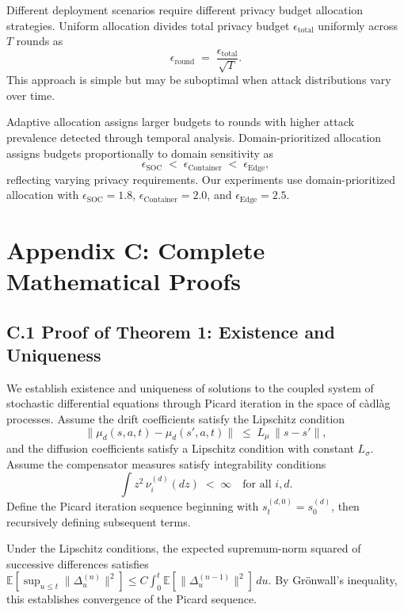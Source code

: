 \documentclass[12pt,a4paper]{article}
\theoremstyle{definition}
\begin{document}
\begingroup
\setlength{\emergencystretch}{2em}

Different deployment scenarios require different privacy budget allocation strategies. Uniform allocation divides total privacy budget \(\epsilon_{\text{total}}\) uniformly across \(T\) rounds as
\[
\epsilon_{\text{round}} \;=\; \frac{\epsilon_{\text{total}}}{\sqrt{T}}.
\]
This approach is simple but may be suboptimal when attack distributions vary over time.

Adaptive allocation assigns larger budgets to rounds with higher attack prevalence detected through temporal analysis. Domain-prioritized allocation assigns budgets proportionally to domain sensitivity as
\[
\epsilon_{\text{SOC}} \;<\; \epsilon_{\text{Container}} \;<\; \epsilon_{\text{Edge}},
\]
reflecting varying privacy requirements. Our experiments use domain-prioritized allocation with
\(\epsilon_{\text{SOC}}=1.8\), \(\epsilon_{\text{Container}}=2.0\), and \(\epsilon_{\text{Edge}}=2.5\).

\endgroup

\section{Appendix C: Complete Mathematical Proofs}

\subsection{C.1 Proof of Theorem 1: Existence and Uniqueness}

\begingroup
\setlength{\emergencystretch}{2em}

We establish existence and uniqueness of solutions to the coupled system of stochastic differential equations through Picard iteration in the space of càdlàg processes. Assume the drift coefficients satisfy the Lipschitz condition
\[
\big\|\mu_d(s,a,t)-\mu_d(s',a,t)\big\| \;\le\; L_{\mu}\,\|s-s'\|,
\]
and the diffusion coefficients satisfy a Lipschitz condition with constant \(L_{\sigma}\). Assume the compensator measures satisfy integrability conditions
\[
\int z^{2}\,\nu_{i}^{(d)}(dz)\;<\;\infty \quad \text{for all } i,d.
\]
Define the Picard iteration sequence beginning with \(s_{t}^{(d,0)}=s_{0}^{(d)}\), then recursively defining subsequent terms.

Under the Lipschitz conditions, the expected supremum-norm squared of successive differences satisfies $\mathbb{E}[\sup_{u \leq t}\|\Delta^{(n)}_u\|^2] \leq C \int_0^t \mathbb{E}[\|\Delta^{(n-1)}_u\|^2]\,du$. By Gr\"onwall's inequality, this establishes convergence of the Picard sequence.
\end{document}
